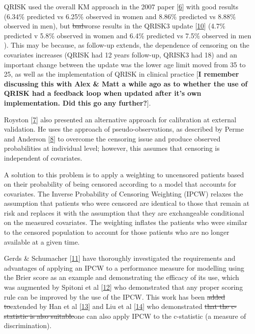 \documentclass[
]{article}
\begin{document}
QRISK used the overall KM approach in the 2007 paper {[}\protect\hyperlink{ref-hippisley-cox_derivation_2007}{6}{]} with good results (6.34\% predicted vs 6.25\% observed in women and 8.86\% predicted vs 8.88\% observed in men), but \sout{bad}worse results in the QRISK3 update {[}\protect\hyperlink{ref-hippisley-cox_development_2017}{10}{]} (4.7\% predicted v 5.8\% observed in women and 6.4\% predicted vs 7.5\% observed in men ). This may be because, as follow-up extends, the dependence of censoring on the covariates increases (QRISK had 12 years follow-up, QRISK3 had 18) and an important change between the update was the lower age limit moved from 35 to 25, as well as the implementation of QRISK in clinical practice {[}\textbf{I remember discussing this with Alex \& Matt a while ago as to whether the use of QRISK had a feedback loop when updated after it's own implementation. Did this go any further?}{]}.

Royston {[}\protect\hyperlink{ref-royston_tools_2014}{7}{]} also presented an alternative approach for calibration at external validation. He uses the approach of pseudo-observations, as described by Perme and Anderson {[}\protect\hyperlink{ref-perme_checking_2008}{8}{]} to overcome the censoring issue and produce observed probabilities at individual level; however, this assumes that censoring is independent of covariates.

A solution to this problem is to apply a weighting to uncensored patients based on their probability of being censored according to a model that accounts for covariates. The Inverse Probability of Censoring Weighting (IPCW) relaxes the assumption that patients who were censored are identical to those that remain at risk and replaces it with the assumption that they are exchangeable conditional on the measured covariates. The weighting inflates the patients who were similar to the censored population to account for those patients who are no longer available at a given time.

Gerds \& Schumacher {[}\protect\hyperlink{ref-gerds_consistent_2006}{11}{]} have thoroughly investigated the requirements and advantages of applying an IPCW to a performance measure for modelling using the Brier score as an example and demonstrating the efficacy of its use, which was augmented by Spitoni et al {[}\protect\hyperlink{ref-spitoni_prediction_2018}{12}{]} who demonstrated that any proper scoring rule can be improved by the use of the IPCW. This work has been \sout{added to}extended by Han et al {[}\protect\hyperlink{ref-han_comparing_2017}{13}{]} and Liu et al {[}\protect\hyperlink{ref-liu_comparing_2016}{14}{]} who demonstrated \sout{that the c-statistic is also suitable}one can also apply IPCW to the c-statistic (a measure of discrimination).
\end{document}
